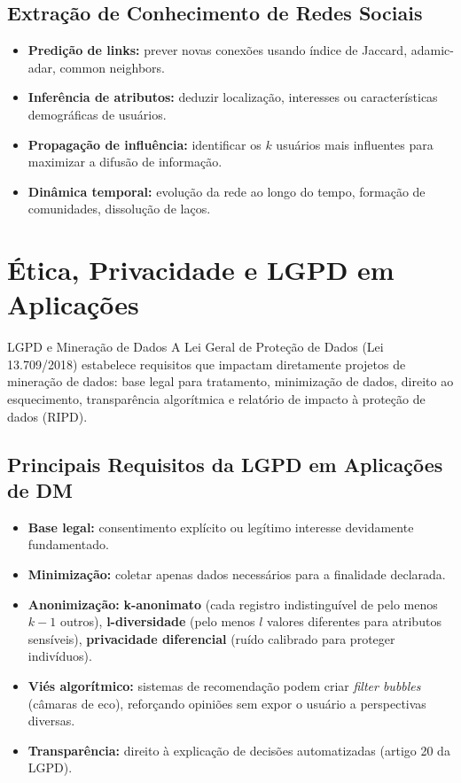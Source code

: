 \documentclass[12pt,a4paper]{article}
\begin{document}
\subsection{Extração de Conhecimento de Redes Sociais}

\begin{itemize}
  \item \textbf{Predição de links:} prever novas conexões usando índice de Jaccard, adamic-adar, common neighbors.
  \item \textbf{Inferência de atributos:} deduzir localização, interesses ou características demográficas de usuários.
  \item \textbf{Propagação de influência:} identificar os $k$ usuários mais influentes para maximizar a difusão de informação.
  \item \textbf{Dinâmica temporal:} evolução da rede ao longo do tempo, formação de comunidades, dissolução de laços.
\end{itemize}

\section{Ética, Privacidade e LGPD em Aplicações}

\begin{atencaobox}{LGPD e Mineração de Dados}
A Lei Geral de Proteção de Dados (Lei 13.709/2018) estabelece requisitos que impactam diretamente projetos de mineração de dados: base legal para tratamento, minimização de dados, direito ao esquecimento, transparência algorítmica e relatório de impacto à proteção de dados (RIPD).
\end{atencaobox}

\subsection*{Principais Requisitos da LGPD em Aplicações de DM}

\begin{itemize}
  \item \textbf{Base legal:} consentimento explícito ou legítimo interesse devidamente fundamentado.
  \item \textbf{Minimização:} coletar apenas dados necessários para a finalidade declarada.
  \item \textbf{Anonimização:} \textbf{k-anonimato} (cada registro indistinguível de pelo menos $k-1$ outros), \textbf{l-diversidade} (pelo menos $l$ valores diferentes para atributos sensíveis), \textbf{privacidade diferencial} (ruído calibrado para proteger indivíduos).
  \item \textbf{Viés algorítmico:} sistemas de recomendação podem criar \textit{filter bubbles} (câmaras de eco), reforçando opiniões sem expor o usuário a perspectivas diversas.
  \item \textbf{Transparência:} direito à explicação de decisões automatizadas (artigo 20 da LGPD).
\end{itemize}
\end{document}
